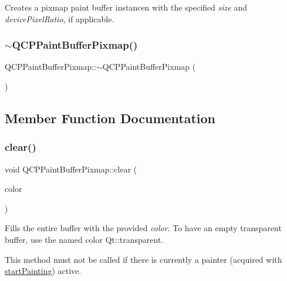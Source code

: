 Creates a pixmap paint buffer instancen with the specified {\itshape size} and {\itshape device\+Pixel\+Ratio}, if applicable. \mbox{\label{class_q_c_p_paint_buffer_pixmap_a52b00bff4a36085b197bd374d5d24450}} 
\subsubsection{\texorpdfstring{$\sim$QCPPaintBufferPixmap()}{~QCPPaintBufferPixmap()}}
{\footnotesize\ttfamily Q\+C\+P\+Paint\+Buffer\+Pixmap\+::$\sim$\+Q\+C\+P\+Paint\+Buffer\+Pixmap (\begin{DoxyParamCaption}{ }\end{DoxyParamCaption})\hspace{0.3cm}{\ttfamily [virtual]}}



\subsection{Member Function Documentation}
\mbox{\label{class_q_c_p_paint_buffer_pixmap_a14badbd010a3cde6b55817ccb7b65217}} 
\subsubsection{\texorpdfstring{clear()}{clear()}}
{\footnotesize\ttfamily void Q\+C\+P\+Paint\+Buffer\+Pixmap\+::clear (\begin{DoxyParamCaption}\item[{const Q\+Color \&}]{color }\end{DoxyParamCaption})\hspace{0.3cm}{\ttfamily [virtual]}}

Fills the entire buffer with the provided {\itshape color}. To have an empty transparent buffer, use the named color {\ttfamily Qt\+::transparent}.

This method must not be called if there is currently a painter (acquired with \mbox{\hyperlink{class_q_c_p_paint_buffer_pixmap_a357964ef7d28cfa530338be4e5c93234}{start\+Painting}}) active. 

